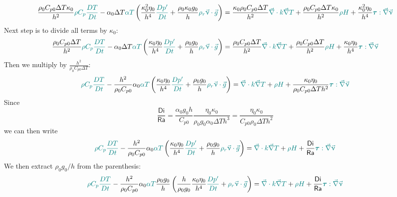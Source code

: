 \documentclass[a4paper,11pt]{article}
\newcommand{\Ranb}{{\mathsf{Ra}}}
\newcommand{\Dinb}{{\mathsf{Di}}}
\begin{document}
\[
\frac{\rho_0 C_{p0} \Delta T \kappa_0}{h^2}
{\color{teal} \rho C_p \frac{DT}{Dt}} 
-
\alpha_0 \Delta T {\color{teal} \alpha T } 
\left(
\frac{ \kappa_0^2 \eta_0}{h^4 } {\color{teal} \frac{Dp'}{Dt} } 
+
\frac{\rho_0 \kappa_0 g_0}{h }
{\color{teal} \rho_r \vec\upnu \cdot \vec{g} } 
\right)
=
\frac{\kappa_0 \rho_0 C_{p0} \Delta T}{h^2}
{\color{teal} \vec\nabla \cdot k \vec\nabla T}
+
\frac{\rho_0 C_{p0} \Delta T \kappa_0 }{h^2}
{\color{teal} \rho H }
+
\frac{\kappa_0^2 \eta_0}{h^4}
{\color{teal} {\bm \tau} : \vec\nabla \vec\upnu} 
\]
Next step is to divide all terms by $\kappa_0$:
\[
\frac{\rho_0 C_{p0} \Delta T }{h^2}
{\color{teal} \rho C_p \frac{DT}{Dt}} 
-
\alpha_0 \Delta T {\color{teal} \alpha T } 
\left(
\frac{ \kappa_0 \eta_0}{h^4 } {\color{teal} \frac{Dp'}{Dt} } 
+
\frac{\rho_0  g_0}{h }
{\color{teal} \rho_r \vec\upnu \cdot \vec{g} } 
\right)
=
\frac{ \rho_0 C_{p0} \Delta T}{h^2}
{\color{teal} \vec\nabla \cdot k \vec\nabla T}
+
\frac{\rho_0 C_{p0} \Delta T  }{h^2}
{\color{teal} \rho H }
+
\frac{\kappa_0 \eta_0}{h^4}
{\color{teal} {\bm \tau} : \vec\nabla \vec\upnu} 
\]
Then we multiply by $\frac{h^2}{\rho_0 C_{p0} \Delta T }$:
\[
{\color{teal} \rho C_p \frac{DT}{Dt}} 
-
\frac{h^2}{\rho_0 C_{p0}  }\alpha_0  {\color{teal} \alpha T } 
\left(
\frac{ \kappa_0 \eta_0}{h^4 } {\color{teal} \frac{Dp'}{Dt} } 
+
\frac{\rho_0  g_0}{h }
{\color{teal} \rho_r \vec\upnu \cdot \vec{g} } 
\right)
=
{\color{teal} \vec\nabla \cdot k \vec\nabla T}
+
{\color{teal} \rho H }
+
\frac{\kappa_0 \eta_0}{\rho_0 C_{p0} \Delta T  h^2}
{\color{teal} {\bm \tau} : \vec\nabla \vec\upnu} 
\]
Since
\[
\frac{\Dinb}{\Ranb} = \frac{\alpha_0 g_0 h}{C_{p0}} 
\frac{\eta_0 \kappa_0}{\rho_0 g_0 \alpha_0 \Delta T h^3}
= \frac{\eta_0 \kappa_0}{C_{p0} \rho_0 \Delta T  h^2}
\]
we can then write 
\[
{\color{teal} \rho C_p \frac{DT}{Dt}} 
-
\frac{h^2}{\rho_0 C_{p0}  }\alpha_0  {\color{teal} \alpha T } 
\left(
\frac{ \kappa_0 \eta_0}{h^4 } {\color{teal} \frac{Dp'}{Dt} } 
+
\frac{\rho_0  g_0}{h }
{\color{teal} \rho_r \vec\upnu \cdot \vec{g} } 
\right)
=
{\color{teal} \vec\nabla \cdot k \vec\nabla T}
+
{\color{teal} \rho H }
+
\frac{\Dinb}{\Ranb} 
{\color{teal} {\bm \tau} : \vec\nabla \vec\upnu} 
\]
We then extract $\rho_0 g_0/h$ from the parenthesis:
\[
{\color{teal} \rho C_p \frac{DT}{Dt}} 
-
\frac{h^2}{\rho_0 C_{p0}  }\alpha_0  {\color{teal} \alpha T } 
\frac{\rho_0  g_0}{h }
\left(
\frac{h}{\rho_0  g_0}
\frac{ \kappa_0 \eta_0}{h^4 } {\color{teal} \frac{Dp'}{Dt} } 
+
{\color{teal} \rho_r \vec\upnu \cdot \vec{g} } 
\right)
=
{\color{teal} \vec\nabla \cdot k \vec\nabla T}
+
{\color{teal} \rho H }
+
\frac{\Dinb}{\Ranb} 
{\color{teal} {\bm \tau} : \vec\nabla \vec\upnu} 
\]
\end{document}
